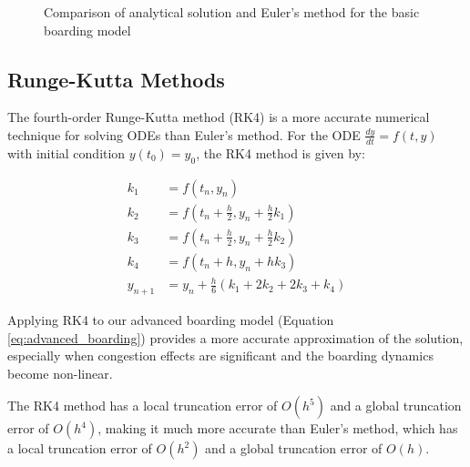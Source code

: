 \documentclass[12pt,a4paper]{article}
\begin{document}
\begin{figure}[H]
\centering
{}
\caption{Comparison of analytical solution and Euler's method for the basic boarding model}
\label{fig:euler_comparison}
\end{figure}

\subsection{Runge-Kutta Methods}

The fourth-order Runge-Kutta method (RK4) is a more accurate numerical technique for solving ODEs than Euler's method. For the ODE $\frac{dy}{dt} = f(t, y)$ with initial condition $y(t_0) = y_0$, the RK4 method is given by:

\begin{align}
k_1 &= f(t_n, y_n) \\
k_2 &= f(t_n + \frac{h}{2}, y_n + \frac{h}{2} k_1) \\
k_3 &= f(t_n + \frac{h}{2}, y_n + \frac{h}{2} k_2) \\
k_4 &= f(t_n + h, y_n + h k_3) \\
y_{n+1} &= y_n + \frac{h}{6}(k_1 + 2k_2 + 2k_3 + k_4)
\label{eq:rk4}
\end{align}

Applying RK4 to our advanced boarding model (Equation \ref{eq:advanced_boarding}) provides a more accurate approximation of the solution, especially when congestion effects are significant and the boarding dynamics become non-linear.

The RK4 method has a local truncation error of $O(h^5)$ and a global truncation error of $O(h^4)$, making it much more accurate than Euler's method, which has a local truncation error of $O(h^2)$ and a global truncation error of $O(h)$.
\end{document}
